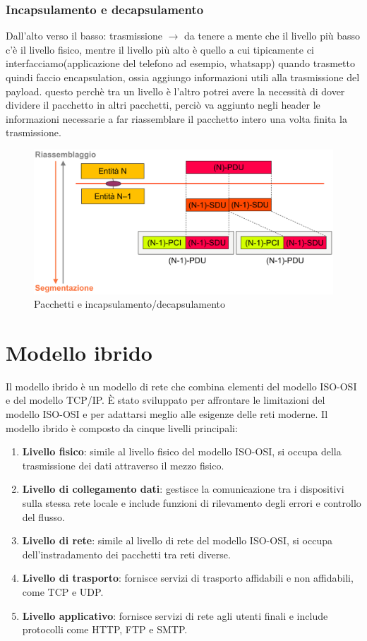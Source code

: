 \subsubsection{Incapsulamento e decapsulamento}
Dall'alto verso il basso: trasmissione $\rightarrow$ da tenere a mente che il livello più basso c’è il livello fisico, mentre il livello più alto è quello a cui tipicamente ci interfacciamo(applicazione del telefono ad esempio, whatsapp)
quando trasmetto quindi faccio encapsulation, ossia aggiungo informazioni utili alla trasmissione del payload. questo perchè tra un livello è l’altro potrei avere la necessità di dover dividere il pacchetto in altri pacchetti, perciò va aggiunto negli header le informazioni necessarie a far riassemblare il pacchetto intero una volta finita la trasmissione.
\begin{figure}[h!]
    \centering
    \includegraphics[width=1\textwidth]{images/ISO_OSI_incapsulamento.png}
    \caption{Pacchetti e incapsulamento/decapsulamento}
    \label{fig:pacchetti}
\end{figure}



\newpage
\section{Modello ibrido}
Il modello ibrido è un modello di rete che combina elementi del modello ISO-OSI e del modello TCP/IP. È stato sviluppato per affrontare le limitazioni del modello ISO-OSI e per adattarsi meglio alle esigenze delle reti moderne.
Il modello ibrido è composto da cinque livelli principali:
\begin{enumerate}
    \item \textbf{Livello fisico}: simile al livello fisico del modello ISO-OSI, si occupa della trasmissione dei dati attraverso il mezzo fisico.
    \item \textbf{Livello di collegamento dati}: gestisce la comunicazione tra i dispositivi sulla stessa rete locale e include funzioni di rilevamento degli errori e controllo del flusso.
    \item \textbf{Livello di rete}: simile al livello di rete del modello ISO-OSI, si occupa dell'instradamento dei pacchetti tra reti diverse.
    \item \textbf{Livello di trasporto}: fornisce servizi di trasporto affidabili e non affidabili, come TCP e UDP.
    \item \textbf{Livello applicativo}: fornisce servizi di rete agli utenti finali e include protocolli come HTTP, FTP e SMTP.
    \end{enumerate}

